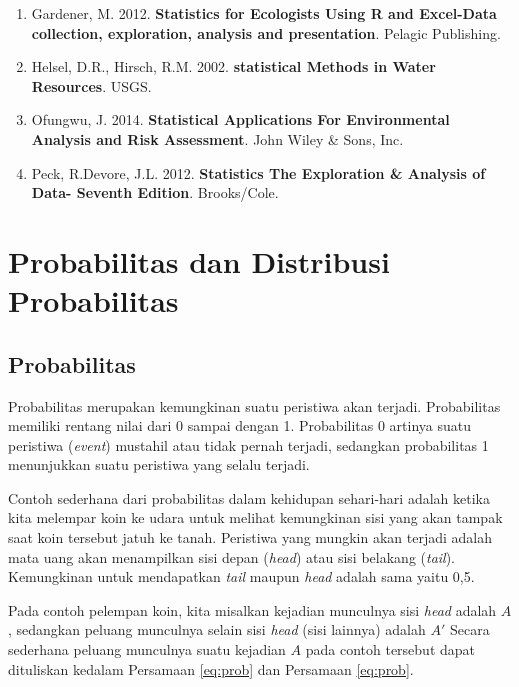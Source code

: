 \documentclass[]{book}
\providecommand{\tightlist}{%
  \setlength{\itemsep}{0pt}\setlength{\parskip}{0pt}}
\begin{document}
\begin{enumerate}
\def\labelenumi{\arabic{enumi}.}
\tightlist
\item
  Gardener, M. 2012. \textbf{Statistics for Ecologists Using R and
  Excel-Data collection, exploration, analysis and presentation}.
  Pelagic Publishing.
\item
  Helsel, D.R., Hirsch, R.M. 2002. \textbf{statistical Methods in Water
  Resources}. USGS.
\item
  Ofungwu, J. 2014. \textbf{Statistical Applications For Environmental
  Analysis and Risk Assessment}. John Wiley \& Sons, Inc.
\item
  Peck, R.Devore, J.L. 2012. \textbf{Statistics The Exploration \&
  Analysis of Data- Seventh Edition}. Brooks/Cole.
\end{enumerate}

\part*{Probabilitas dan Distribusi
Probabilitas}\label{part-probabilitas-dan-distribusi-probabilitas}

\chapter{Probabilitas}\label{probabilitas}

Probabilitas merupakan kemungkinan suatu peristiwa akan terjadi.
Probabilitas memiliki rentang nilai dari 0 sampai dengan 1. Probabilitas
0 artinya suatu peristiwa (\emph{event}) mustahil atau tidak pernah
terjadi, sedangkan probabilitas 1 menunjukkan suatu peristiwa yang
selalu terjadi.

Contoh sederhana dari probabilitas dalam kehidupan sehari-hari adalah
ketika kita melempar koin ke udara untuk melihat kemungkinan sisi yang
akan tampak saat koin tersebut jatuh ke tanah. Peristiwa yang mungkin
akan terjadi adalah mata uang akan menampilkan sisi depan (\emph{head})
atau sisi belakang (\emph{tail}). Kemungkinan untuk mendapatkan
\emph{tail} maupun \emph{head} adalah sama yaitu 0,5.

Pada contoh pelempan koin, kita misalkan kejadian munculnya sisi
\emph{head} adalah \(A\), sedangkan peluang munculnya selain sisi
\emph{head} (sisi lainnya) adalah \(A'\) Secara sederhana peluang
munculnya suatu kejadian \(A\) pada contoh tersebut dapat dituliskan
kedalam Persamaan \eqref{eq:prob} dan Persamaan \eqref{eq:prob}.
\end{document}

